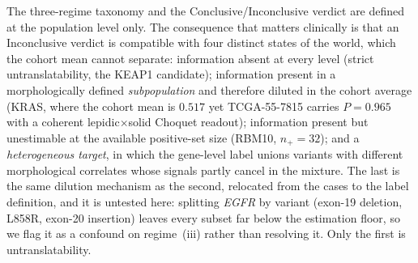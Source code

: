 \begin{flushleft}\footnotesize
The three-regime taxonomy and the Conclusive/Inconclusive verdict are
defined at the population level only.
The consequence that matters clinically is that an Inconclusive
verdict is compatible with four distinct states of the world, which
the cohort mean cannot separate: information absent at every level
(strict untranslatability, the KEAP1 candidate); information present
in a morphologically defined \emph{subpopulation} and therefore
diluted in the cohort average (KRAS, where the cohort mean is $0.517$
yet TCGA-55-7815 carries $P=0.965$ with a coherent
lepidic$\times$solid Choquet readout); information present but
unestimable at the available positive-set size (RBM10, $n_+=32$); and a
\emph{heterogeneous target}, in which the gene-level label unions
variants with different morphological correlates whose signals partly
cancel in the mixture. The last is the same dilution mechanism as the
second, relocated from the cases to the label definition, and it is
untested here: splitting \textit{EGFR} by variant
(exon-19 deletion, L858R, exon-20 insertion) leaves every subset far
below the estimation floor, so we flag it as a confound on regime~(iii)
rather than resolving it.
Only the first is untranslatability.
\end{flushleft}
